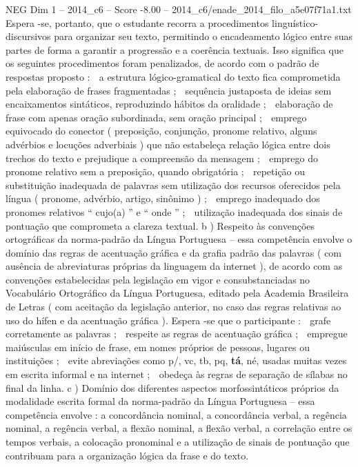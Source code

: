 \begin{textsample}{NEG Dim 1 – 2014\_c6 – Score -8.00 – 2014\_c6/enade\_2014\_filo\_a5e07f71a1.txt}
Espera -se, portanto, que o estudante recorra a procedimentos linguístico-discursivos para organizar seu texto, permitindo o encadeamento lógico entre suas partes de forma a garantir a progressão e a coerência textuais.
Isso significa que os seguintes procedimentos foram penalizados, de acordo com o padrão de respostas proposto :  a estrutura lógico-gramatical do texto fica comprometida pela elaboração de frases fragmentadas ;  sequência justaposta de ideias sem encaixamentos sintáticos, reproduzindo hábitos da oralidade ;  elaboração de frase com apenas oração subordinada, sem oração principal ;  emprego equivocado do conector ( preposição, conjunção, pronome relativo, alguns advérbios e locuções adverbiais ) que não estabeleça relação lógica entre dois trechos do texto e prejudique a compreensão da mensagem ;  emprego do pronome relativo sem a preposição, quando obrigatória ;  repetição ou substituição inadequada de palavras sem utilização dos recursos oferecidos pela língua ( pronome, advérbio, artigo, sinônimo ) ;  emprego inadequado dos pronomes relativos “ cujo(a) ” e “ onde ” ;  utilização inadequada dos sinais de pontuação que comprometa a clareza textual. b ) Respeito às convenções ortográficas da norma-padrão da Língua Portuguesa – essa competência envolve o domínio das regras de acentuação gráfica e da grafia padrão das palavras ( com ausência de abreviaturas próprias da linguagem da internet ), de acordo com as convenções estabelecidas pela legislação em vigor e consubstanciadas no Vocabulário Ortográfico da Língua Portuguesa, editado pela Academia Brasileira de Letras ( com aceitação da legislação anterior, no caso das regras relativas ao uso do hífen e da acentuação gráfica ).
Espera -se que o participante :  grafe corretamente as palavras ;  respeite as regras de acentuação gráfica ;  empregue maiúsculas em início de frase, em nomes próprios de pessoas, lugares ou instituições ;  evite abreviações como p/, vc, tb, pq, \textbf{tá}, né, usadas muitas vezes em escrita informal e na internet ;  obedeça às regras de separação de sílabas no final da linha. c ) Domínio dos diferentes aspectos morfossintáticos próprios da modalidade escrita formal da norma-padrão da Língua Portuguesa – essa competência envolve : a concordância nominal, a concordância verbal, a regência nominal, a regência verbal, a flexão nominal, a flexão verbal, a correlação entre os tempos verbais, a colocação pronominal e a utilização de sinais de pontuação que contribuam para a organização lógica da frase e do texto.

\end{textsample}
